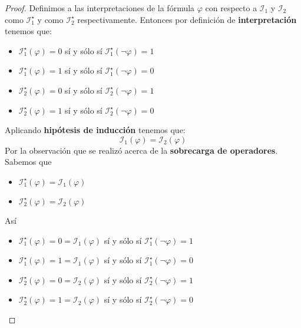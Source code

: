 \documentclass[a4paper]{article}
\begin{document}
\begin{proof}
    Definimos a las interpretaciones de la fórmula \(\varphi\) con respecto a \(\mathcal{I}_{1}\) y 
    \(\mathcal{I}_{2}\) como \(\mathcal{I}^{\star}_{1}\) y como \(\mathcal{I}^{\star}_{2}\) 
    respectivamente. Entonces por definición de \textbf{interpretación} tenemos que:
    \begin{itemize}
        \item \(\mathcal{I}^{\star}_{1}\left(\varphi\right) = 0\) sí y sólo sí \(\mathcal{I}^{\star}_{1}\left(\neg \varphi\right) = 1\)
        \item \(\mathcal{I}^{\star}_{1}\left(\varphi\right) = 1\) sí y sólo sí \(\mathcal{I}^{\star}_{1}\left(\neg \varphi\right) = 0\)
        \item \(\mathcal{I}^{\star}_{2}\left(\varphi\right) = 0\) sí y sólo sí \(\mathcal{I}^{\star}_{2}\left(\neg \varphi\right) = 1\)
        \item \(\mathcal{I}^{\star}_{2}\left(\varphi\right) = 1\) sí y sólo sí \(\mathcal{I}^{\star}_{2}\left(\neg \varphi\right) = 0\)
    \end{itemize}
    Aplicando \textbf{hipótesis de inducción} tenemos que:
    \[
        \mathcal{I}_1(\varphi)=\mathcal{I}_2(\varphi)
    \]
    Por la observación que se realizó acerca de la \textbf{sobrecarga de operadores}. Sabemos que 
    \begin{itemize}
        \item \(\mathcal{I}^{\star}_{1}\left(\varphi\right) = \mathcal{I}_{1}\left(\varphi\right)\)
        \item \(\mathcal{I}^{\star}_{2}\left(\varphi\right) = \mathcal{I}_{2}\left(\varphi\right)\)
    \end{itemize}
    Así 
    \begin{itemize}
        \item \(\mathcal{I}^{\star}_{1}\left(\varphi\right) = 0 = \mathcal{I}_{1}\left(\varphi\right)\) sí y sólo sí \(\mathcal{I}^{\star}_{1}\left(\neg \varphi\right) = 1\)
        \item \(\mathcal{I}^{\star}_{1}\left(\varphi\right) = 1 = \mathcal{I}_{1}\left(\varphi\right)\) sí y sólo sí \(\mathcal{I}^{\star}_{1}\left(\neg \varphi\right) = 0\)
        \item \(\mathcal{I}^{\star}_{2}\left(\varphi\right) = 0 = \mathcal{I}_{2}\left(\varphi\right)\) sí y sólo sí \(\mathcal{I}^{\star}_{2}\left(\neg \varphi\right) = 1\)
        \item \(\mathcal{I}^{\star}_{2}\left(\varphi\right) = 1 = \mathcal{I}_{2}\left(\varphi\right)\) sí y sólo sí \(\mathcal{I}^{\star}_{2}\left(\neg \varphi\right) = 0\)

\end{itemize}
\end{proof}
\end{document}
